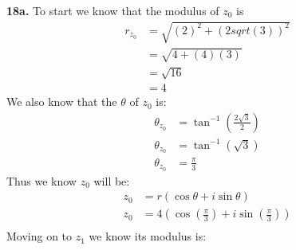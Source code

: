 \documentclass[11pt]{article}
\begin{document}
\parindent=0pt

\textbf{18a.} To start we know that the modulus of $z_0$ is
\begin{align*}
 r_{z_0} & = \sqrt{(2)^2 + (2sqrt(3))^2} \\
& = \sqrt{4 + (4)(3)} \\
& = \sqrt{16} \\
& = 4
\end{align*}
We also know that the $\theta$ of $z_0$ is:
\begin{align*}
 \theta_{z_0} & = \tan^{-1}(\frac{2\sqrt{3}}{2})\\
 \theta_{z_0} & = \tan^{-1}(\sqrt{3})\\
 \theta_{z_0} & = \frac{\pi}{3}
\end{align*}
Thus we know $z_0$ will be:
\begin{align*}
 z_0 & = r(\cos\theta + i\sin\theta) \\
 z_0 & = 4(\cos(\frac{\pi}{3}) + i\sin(\frac{\pi}{3})) \\
\end{align*}
Moving on to $z_1$ we know its modulus is:
\end{document}
